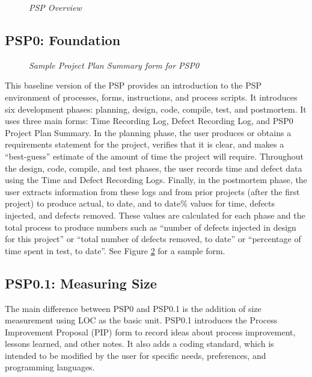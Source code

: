 \begin{figure} [tp]
    {\centerline{}}
    \caption[PSP Overview]{\label{fig:pspOverview}
    {\em PSP Overview}}
\end{figure}

\subsection{PSP0: Foundation}

\begin{figure} [hp]
    {\centerline{}}
    \caption[Sample Project Plan Summary Form for PSP0]{\label{fig:PPS0}
    {\em Sample Project Plan Summary form for PSP0}}
\end{figure}

This baseline version of the PSP provides an introduction to the PSP
environment of processes, forms, instructions, and process scripts.  It
introduces six development phases: planning, design, code, compile, test,
and postmortem. It uses three main forms: Time Recording Log, Defect
Recording Log, and PSP0 Project Plan Summary.  In the planning phase, the
user produces or obtains a requirements statement for the project, verifies
that it is clear, and makes a ``best-guess'' estimate of the amount of time
the project will require.  Throughout the design, code, compile, and test
phases, the user records time and defect data using the Time and Defect
Recording Logs.  Finally, in the postmortem phase, the user extracts
information from these logs and from prior projects (after the first
project) to produce actual, to date, and to date\% values for time, defects
injected, and defects removed.  These values are calculated for each phase
and the total process to produce numbers such as ``number of defects
injected in design for this project'' or ``total number of defects removed,
to date'' or ``percentage of time spent in test, to date''. See Figure
\ref{fig:PPS0} for a sample form.
     
\subsection{PSP0.1: Measuring Size}

The main difference between PSP0 and PSP0.1 is the addition of size
measurement using LOC as the basic unit. PSP0.1 introduces the Process
Improvement Proposal (PIP) form to record ideas about process improvement,
lessons learned, and other notes. It also adds a coding standard, which is
intended to be modified by the user for specific needs, preferences, and
programming languages.

